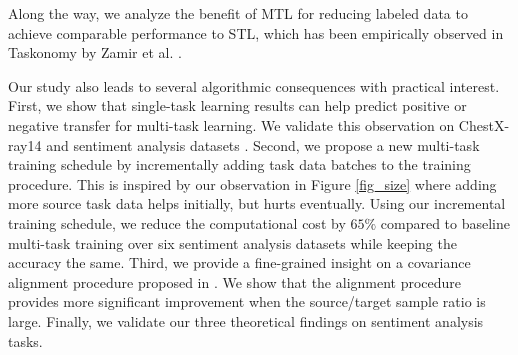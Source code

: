 \squishend
Along the way, we analyze the benefit of MTL for reducing labeled data to achieve comparable performance to STL, which has been empirically observed in Taskonomy by Zamir et al. \cite{ZSSGM18}.

Our study also leads to several algorithmic consequences with practical interest.
First, we show that single-task learning results can help predict positive or negative transfer for multi-task learning.
We validate this observation on ChestX-ray14 \cite{chexnet17} and sentiment analysis datasets \cite{LZWDA18}.
Second, we propose a new multi-task training schedule by incrementally adding task data batches to the training procedure.
This is inspired by our observation in Figure \ref{fig_size} where adding more source task data helps initially, but hurts eventually.
Using our incremental training schedule, we reduce the computational cost by $65\%$ compared to baseline multi-task training over six sentiment analysis datasets while keeping the accuracy the same.
Third, we provide a fine-grained insight on a covariance alignment procedure proposed in \cite{WZR20}.
We show that the alignment procedure provides more significant improvement when the source/target sample ratio is large.
Finally, we validate our three theoretical findings on sentiment analysis tasks.

